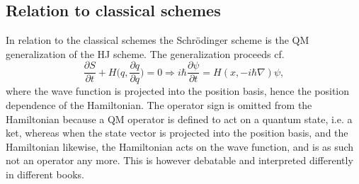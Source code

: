 \subsection*{Relation to classical schemes}
In relation to the classical schemes the Schrödinger scheme is the QM generalization of the HJ scheme. The generalization proceeds cf.
\begin{equation}
	\frac{\partial S}{\partial t}+H\bigg(q,\frac{\partial q}{\partial q}\bigg)=0\Rightarrow i\hbar \frac{\partial \psi}{\partial t}=H(x,-i\hbar\nabla)\psi,
\end{equation} 
where the wave function is projected into the position basis, hence the position dependence of the Hamiltonian. The operator sign is omitted from the Hamiltonian because a QM operator is defined to act on a quantum state, i.e. a ket, whereas when the state vector is projected into the position basis, and the Hamiltonian likewise, the Hamiltonian acts on the wave function, and is as such not an operator any more. This is however debatable and interpreted differently in different books. 

